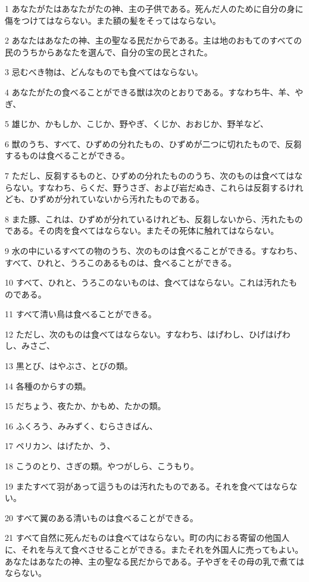 \par 1 あなたがたはあなたがたの神、主の子供である。死んだ人のために自分の身に傷をつけてはならない。また額の髪をそってはならない。
\par 2 あなたはあなたの神、主の聖なる民だからである。主は地のおもてのすべての民のうちからあなたを選んで、自分の宝の民とされた。
\par 3 忌むべき物は、どんなものでも食べてはならない。
\par 4 あなたがたの食べることができる獣は次のとおりである。すなわち牛、羊、やぎ、
\par 5 雄じか、かもしか、こじか、野やぎ、くじか、おおじか、野羊など、
\par 6 獣のうち、すべて、ひずめの分れたもの、ひずめが二つに切れたもので、反芻するものは食べることができる。
\par 7 ただし、反芻するものと、ひずめの分れたもののうち、次のものは食べてはならない。すなわち、らくだ、野うさぎ、および岩だぬき、これらは反芻するけれども、ひずめが分れていないから汚れたものである。
\par 8 また豚、これは、ひずめが分れているけれども、反芻しないから、汚れたものである。その肉を食べてはならない。またその死体に触れてはならない。
\par 9 水の中にいるすべての物のうち、次のものは食べることができる。すなわち、すべて、ひれと、うろこのあるものは、食べることができる。
\par 10 すべて、ひれと、うろこのないものは、食べてはならない。これは汚れたものである。
\par 11 すべて清い鳥は食べることができる。
\par 12 ただし、次のものは食べてはならない。すなわち、はげわし、ひげはげわし、みさご、
\par 13 黒とび、はやぶさ、とびの類。
\par 14 各種のからすの類。
\par 15 だちょう、夜たか、かもめ、たかの類。
\par 16 ふくろう、みみずく、むらさきばん、
\par 17 ペリカン、はげたか、う、
\par 18 こうのとり、さぎの類。やつがしら、こうもり。
\par 19 またすべて羽があって這うものは汚れたものである。それを食べてはならない。
\par 20 すべて翼のある清いものは食べることができる。
\par 21 すべて自然に死んだものは食べてはならない。町の内におる寄留の他国人に、それを与えて食べさせることができる。またそれを外国人に売ってもよい。あなたはあなたの神、主の聖なる民だからである。子やぎをその母の乳で煮てはならない。
